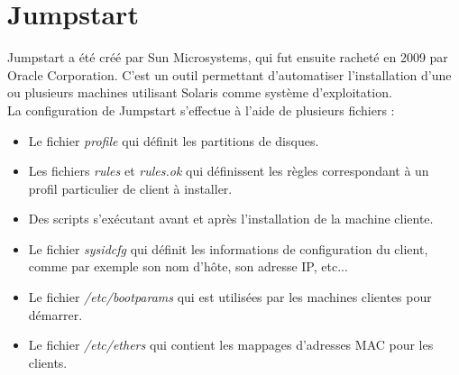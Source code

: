 \documentclass[a4paper,12pt,one side,titlepage]{report}
\begin{document}
\section{Jumpstart}
Jumpstart a été créé par Sun Microsystems, qui fut ensuite racheté en 2009 par Oracle Corporation. C'est un outil permettant d'automatiser l'installation d'une ou plusieurs machines utilisant Solaris comme système d'exploitation.\\
La configuration de Jumpstart s'effectue à l'aide de plusieurs fichiers :\\
\begin{itemize}
  \item Le fichier \textit{profile} qui définit les partitions de disques.
  \item Les fichiers \textit{rules} et \textit{rules.ok} qui définissent les règles correspondant à un profil particulier de client à installer.
  \item Des scripts s'exécutant avant et après l'installation de la machine cliente.
  \item Le fichier \textit{sysidcfg} qui définit les informations de configuration du client, comme par exemple son nom d'hôte, son adresse IP, etc...
  \item Le fichier \textit{/etc/bootparams} qui est utilisées par les machines clientes pour démarrer.
  \item Le fichier \textit{/etc/ethers} qui contient les mappages d'adresses MAC pour les clients.\\
\end{itemize}
\end{document}
